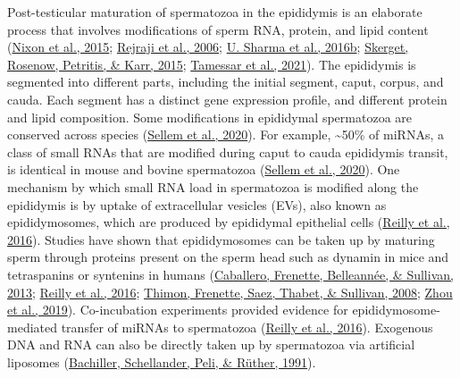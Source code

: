 \documentclass[12pt,twoside]{reedthesis}
\begin{document}
Post-testicular maturation of spermatozoa in the epididymis is an
elaborate process that involves modifications of sperm RNA, protein, and
lipid content (\protect\hyperlink{ref-nixon_2015}{Nixon et al., 2015}; \protect\hyperlink{ref-rejraji_2006}{Rejraji et al., 2006}; \protect\hyperlink{ref-sharma_2016}{U. Sharma et al., 2016b}; \protect\hyperlink{ref-skerget_2015}{Skerget, Rosenow, Petritis, \& Karr, 2015}; \protect\hyperlink{ref-tamessar_2021}{Tamessar et al., 2021}). The epididymis is segmented into different parts,
including the initial segment, caput, corpus, and cauda. Each segment
has a distinct gene expression profile, and different protein and lipid
composition. Some modifications in epididymal spermatozoa are conserved
across species (\protect\hyperlink{ref-sellem_2020}{Sellem et al., 2020}). For example, \textasciitilde50\% of miRNAs, a class of
small RNAs that are modified during caput to cauda epididymis transit,
is identical in mouse and bovine spermatozoa (\protect\hyperlink{ref-sellem_2020}{Sellem et al., 2020}). One
mechanism by which small RNA load in spermatozoa is modified along the
epididymis is by uptake of extracellular vesicles (EVs), also known as
epididymosomes, which are produced by epididymal epithelial cells
(\protect\hyperlink{ref-reilly_2016}{Reilly et al., 2016}). Studies have shown that epididymosomes can be taken up
by maturing sperm through proteins present on the sperm head such as
dynamin in mice and tetraspanins or syntenins in humans
(\protect\hyperlink{ref-caballero_2013}{Caballero, Frenette, Belleannée, \& Sullivan, 2013}; \protect\hyperlink{ref-reilly_2016}{Reilly et al., 2016}; \protect\hyperlink{ref-thimon_2008}{Thimon, Frenette, Saez, Thabet, \& Sullivan, 2008}; \protect\hyperlink{ref-zhou_2019}{Zhou et al., 2019}). Co-incubation
experiments provided evidence for epididymosome-mediated transfer of
miRNAs to spermatozoa (\protect\hyperlink{ref-reilly_2016}{Reilly et al., 2016}). Exogenous DNA and RNA can also be
directly taken up by spermatozoa via artificial liposomes
(\protect\hyperlink{ref-bachiller_1991}{Bachiller, Schellander, Peli, \& Rüther, 1991}).
\end{document}
